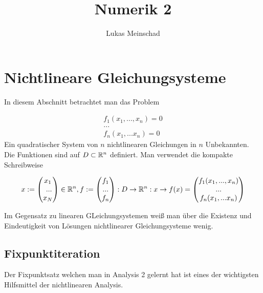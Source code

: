 \documentclass{report}
\title{\Huge{Numerik 2}}
\author{\huge{Lukas Meinschad}}
\date{}
\begin{document}
\maketitle
\newpage%
\tableofcontents
\pagebreak

\section{Nichtlineare Gleichungsysteme} %
\label{sec:nichtlineare_gleichungsysteme}

In diesem Abschnitt betrachtet man das Problem

\begin{align}
    f_1(x_1,...,x_n) = 0 \\
    ... \\
    f_n(x_1,...x_n) = 0
\end{align}
Ein quadratischer System von $n$ nichtlinearen Gleichungen in $n$ Unbekannten. Die Funktionen sind auf $D \subset \RR^n$ definiert. Man verwendet die kompakte Schreibweise

\begin{equation}
    x := \begin{pmatrix} x_1 \\ ... \\ x_N \end{pmatrix} \in \RR^n, f:= \begin{pmatrix} f_1 \\ ... \\ f_n \end{pmatrix}: D \to \RR^n: x \to f(x) = \begin{pmatrix} f_1(x_1,...,x_n) \\ ... \\  f_n(x_1,...x_n) \end{pmatrix}
\end{equation}

Im Gegensatz zu linearen GLeichungsystemen weiß man über die Existenz und Eindeutigkeit von Lösungen nichtlinearer Gleichungsysteme wenig.

\subsection{Fixpunktiteration} %
\label{sub:fixpunktiteration}

Der Fixpunktsatz welchen man in Analysis 2 gelernt hat ist eines der wichtigsten Hilfsmittel der nichtlinearen Analysis. 
\end{document}
